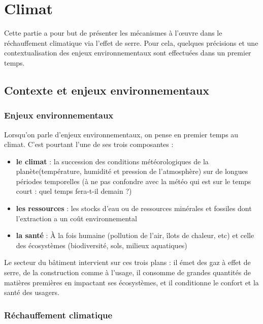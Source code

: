 \part{Climat}
Cette partie a pour but de présenter les mécanismes à l’œuvre dans le réchauffement climatique via l'effet de serre. Pour cela, quelques précisions et une contextualisation des enjeux environnementaux sont effectuées dans un premier temps.

\chapter{Contexte et enjeux environnementaux}
\section{Enjeux environnementaux}
\label{sec:enjeux}
 
Lorsqu'on parle d'enjeux environnementaux, on pense en premier temps au climat. C'est pourtant l'une de ses trois composantes :
 
\begin{itemize}
    \item \textbf{le climat} : la succession des conditions météorologiques de la planète(température, humidité et pression de l'atmosphère) sur de longues périodes temporelles (à ne pas confondre avec la météo qui est sur le temps court : quel temps fera-t-il demain ?)
    \item \textbf{les ressources} : les stocks d'eau ou de
    ressources minérales et fossiles dont l'extraction a un coût environnemental
    \item \textbf{la santé} : À la fois humaine
    (pollution de l'air, îlots de chaleur, etc) et celle des écosystèmes (biodiversité,
    sols, milieux aquatiques)
\end{itemize}
 
Le secteur du bâtiment intervient sur ces trois plans : il émet des gaz à effet de serre, de la construction comme à l'usage, il consomme de grandes quantités de matières premières en impactant ses écosystèmes, et il conditionne le confort et la santé des usagers.
 
\section{Réchauffement climatique}
\label{sec:rechauffement}
 
